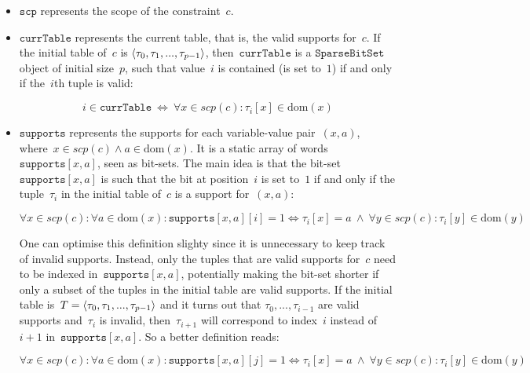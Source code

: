 \documentclass[a4paper,11pt]{article}
\newcommand{\Dom}[1]{\text{dom}({#1})}
\newcommand{\SparseBitSet}{\texttt{SparseBitSet}}
\newcommand{\Scp}{\texttt{scp}}
\newcommand{\CurrTable}{\texttt{currTable}}
\newcommand{\Supports}{\texttt{supports}}
\begin{document}
\begin{itemize}
  \item $\Scp$ represents the scope of the constraint~$c$.
  \item $\CurrTable$ represents the current table,
    that is, the valid supports for~$c$. If the initial table of~$c$ is
    $\left\langle\tau_0, \tau_1, ..., \tau_{p-1}\right\rangle$, then~$\CurrTable$ is a 
    $\SparseBitSet$ object of initial size~$p$, such that value~$i$
    is contained (is set to~$1$) if and only if the~$i$th tuple is valid:
    
    \begin{equation}
      \label{eq:currtable}
      i \in \CurrTable \ \Leftrightarrow \ \forall x \in scp(c): \tau_i[x] \in \Dom{x}
    \end{equation}

  \item $\Supports$ represents the supports for each variable-value pair~$(x,a)$,
    where~$x \in scp(c) \land a \in \Dom{x}$.
    It is a static array of words~$\Supports[x,a]$, seen as bit-sets.
    The main idea is that the bit-set~$\Supports[x,a]$ is such that
    the bit at position~$i$ is set to~$1$ if and only if the 
    tuple~$\tau_i$ in the initial table of~$c$ is a support for~$(x,a)$:

    \begin{equation}
      \forall x \in scp(c): \forall a \in \Dom{x}:
      \Supports[x,a][i] = 1 \Leftrightarrow \tau_i[x] = a \ \land \
      \forall y \in scp(c): \tau_i[y] \in \Dom{y}
    \end{equation}

    One can optimise this definition slighty since it is unnecessary to keep track of
    invalid supports. Instead, only the tuples that are valid supports for~$c$
    need to be indexed in~$\Supports[x,a]$, potentially making the bit-set shorter
    if only a subset of the tuples in the initial table are valid supports. 
    If the initial table 
    is~$T = \left\langle\tau_0, \tau_1, ..., \tau_{p-1}\right\rangle$ and it turns out that
    $\tau_0,...,\tau_{i-1}$ are valid supports and~$\tau_{i}$ is invalid, then~$\tau_{i+1}$
    will correspond to index~$i$ instead of~$i+1$ in~$\Supports[x,a]$. So a better
    definition reads:

    \begin{equation}
      \forall x \in scp(c): \forall a \in \Dom{x}:
      \Supports[x,a][j] = 1 \Leftrightarrow \tau_i[x] = a \ \land \
      \forall y \in scp(c): \tau_i[y] \in \Dom{y}
    \end{equation}
    

\end{itemize}
\end{document}
